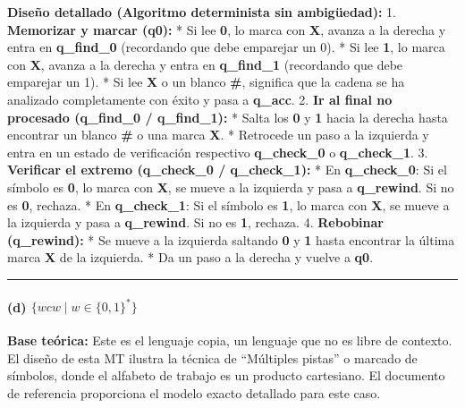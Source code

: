 \documentclass[12pt]{book} %
\begin{document}
\textbf{Diseño detallado (Algoritmo determinista sin ambigüedad):} 1.
\textbf{Memorizar y marcar (q0):} * Si lee \textbf{0}, lo marca con
\textbf{X}, avanza a la derecha y entra en \textbf{q\_find\_0}
(recordando que debe emparejar un 0). * Si lee \textbf{1}, lo marca con
\textbf{X}, avanza a la derecha y entra en \textbf{q\_find\_1}
(recordando que debe emparejar un 1). * Si lee \textbf{X} o un blanco
\textbf{\#}, significa que la cadena se ha analizado completamente con
éxito y pasa a \textbf{q\_acc}. 2. \textbf{Ir al final no procesado
(q\_find\_0 / q\_find\_1):} * Salta los \textbf{0} y \textbf{1} hacia la
derecha hasta encontrar un blanco \textbf{\#} o una marca \textbf{X}. *
Retrocede un paso a la izquierda y entra en un estado de verificación
respectivo \textbf{q\_check\_0} o \textbf{q\_check\_1}. 3.
\textbf{Verificar el extremo (q\_check\_0 / q\_check\_1):} * En
\textbf{q\_check\_0}: Si el símbolo es \textbf{0}, lo marca con
\textbf{X}, se mueve a la izquierda y pasa a \textbf{q\_rewind}. Si no
es \textbf{0}, rechaza. * En \textbf{q\_check\_1}: Si el símbolo es
\textbf{1}, lo marca con \textbf{X}, se mueve a la izquierda y pasa a
\textbf{q\_rewind}. Si no es \textbf{1}, rechaza. 4. \textbf{Rebobinar
(q\_rewind):} * Se mueve a la izquierda saltando \textbf{0} y \textbf{1}
hasta encontrar la última marca \textbf{X} de la izquierda. * Da un paso
a la derecha y vuelve a \textbf{q0}.

\begin{center}\rule{0.5\linewidth}{0.5pt}\end{center}

\hypertarget{d-wcw-mid-w-in-01}{%
\paragraph{\texorpdfstring{(d)
\(\{wcw \mid w \in \{0,1\}^*\}\)}{(d) \textbackslash\{wcw \textbackslash mid w \textbackslash in \textbackslash\{0,1\textbackslash\}\^{}*\textbackslash\}}}\label{d-wcw-mid-w-in-01}}

\textbf{Base teórica:} Este es el lenguaje copia, un lenguaje que no es
libre de contexto. El diseño de esta MT ilustra la técnica de
``Múltiples pistas'' o marcado de símbolos, donde el alfabeto de trabajo
es un producto cartesiano. El documento de referencia proporciona el
modelo exacto detallado para este caso.
\end{document}
